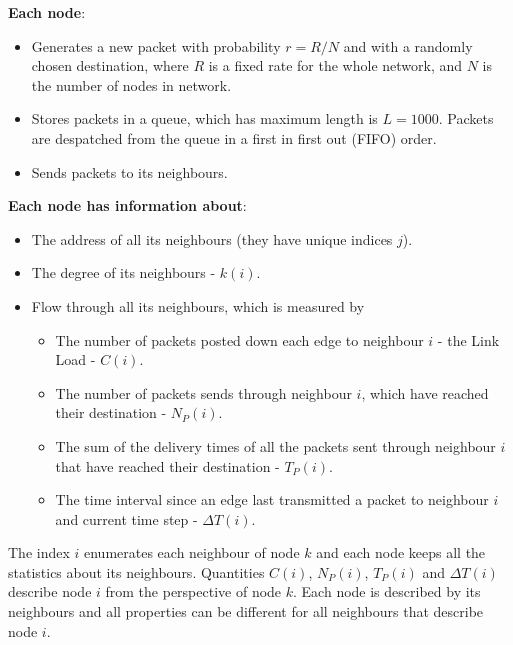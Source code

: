 \documentclass[runningheads]{llncs}
\begin{document}
\textbf{Each node}:
\begin{itemize}
  \item Generates a new packet with probability $r=R/N$ and
  with a randomly chosen destination, where $R$ is a fixed rate
  for the whole network, and $N$ is the number of nodes in network.
  \item Stores packets in a queue, which has maximum length
  is $L=1000$. Packets are despatched from the queue in a first
  in first out (FIFO) order.
  \item Sends packets to its neighbours.
\end{itemize}

\textbf{Each node has information about}:
\begin{itemize}
  \item The address of all its
neighbours (they have unique indices $j$).
  \item The degree of its neighbours - $k(i)$.
  \item Flow through all its neighbours, which is measured by
\begin{itemize}
  \item The number of packets posted down each edge to neighbour $i$ - the Link Load -  $C(i)$.
  \item  The number of packets sends through neighbour $i$, which have reached their destination
  - $N_P(i)$.
  \item The sum of the delivery times of all the packets sent through neighbour $i$ that have reached their
destination - $T_P(i)$.
\item The time interval since an edge last
transmitted a packet to neighbour $i$ and current time step -
$\Delta T(i)$.
\end{itemize}

\end{itemize}

The index $i$ enumerates each neighbour of node $k$ and each node
keeps all the statistics about its neighbours. Quantities $C(i)$,
$N_P(i)$, $T_P(i)$ and $\Delta T(i)$ describe node $i$ from the
perspective of node $k$. Each node is described by its neighbours
and all properties can be different for all neighbours that describe
node $i$.
\end{document}
